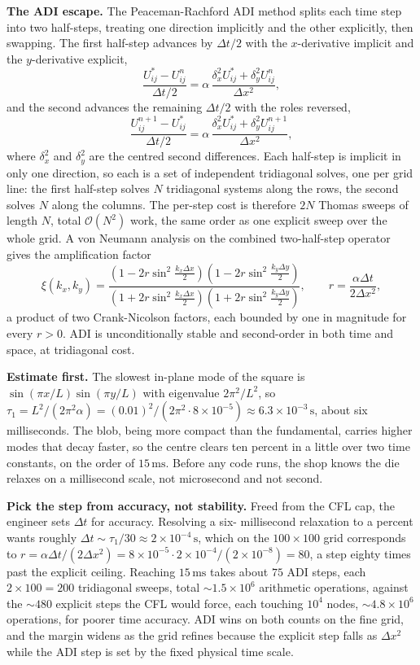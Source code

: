 \textbf{The ADI escape.} The Peaceman-Rachford ADI method splits
each time step into two half-steps, treating one direction
implicitly and the other explicitly, then swapping. The first
half-step advances by $\Delta t/2$ with the $x$-derivative implicit
and the $y$-derivative explicit,
\[
\frac{U^{*}_{ij} - U^{n}_{ij}}{\Delta t/2}
   = \alpha\,\frac{\delta_{x}^{2}U^{*}_{ij} + \delta_{y}^{2}U^{n}_{ij}}{\Delta x^{2}},
\]
and the second advances the remaining $\Delta t/2$ with the roles
reversed,
\[
\frac{U^{n+1}_{ij} - U^{*}_{ij}}{\Delta t/2}
   = \alpha\,\frac{\delta_{x}^{2}U^{*}_{ij} + \delta_{y}^{2}U^{n+1}_{ij}}{\Delta x^{2}},
\]
where $\delta_{x}^{2}$ and $\delta_{y}^{2}$ are the centred second
differences. Each half-step is implicit in only one direction, so
each is a set of independent tridiagonal solves, one per grid line:
the first half-step solves $N$ tridiagonal systems along the rows,
the second solves $N$ along the columns. The per-step cost is
therefore $2N$ Thomas sweeps of length $N$, total $\mathcal{O}(N^{2})$
work, the same order as one explicit sweep over the whole grid. A
von Neumann analysis on the combined two-half-step operator gives
the amplification factor
\[
\xi(k_{x}, k_{y}) =
\frac{(1 - 2r\sin^{2}\tfrac{k_{x}\Delta x}{2})(1 - 2r\sin^{2}\tfrac{k_{y}\Delta y}{2})}
     {(1 + 2r\sin^{2}\tfrac{k_{x}\Delta x}{2})(1 + 2r\sin^{2}\tfrac{k_{y}\Delta y}{2})},
\qquad r = \frac{\alpha\Delta t}{2\Delta x^{2}},
\]
a product of two Crank-Nicolson factors, each bounded by one in
magnitude for every $r > 0$. ADI is unconditionally stable and
second-order in both time and space, at tridiagonal cost.

\textbf{Estimate first.} The slowest in-plane mode of the square is
$\sin(\pi x/L)\sin(\pi y/L)$ with eigenvalue $2\pi^{2}/L^{2}$, so
$\tau_{1} = L^{2}/(2\pi^{2}\alpha) = (0.01)^{2}/(2\pi^{2}\cdot
8\times 10^{-5}) \approx 6.3\times 10^{-3}\,\si{\second}$, about six
milliseconds. The blob, being more compact than the fundamental,
carries higher modes that decay faster, so the centre clears ten
percent in a little over two time constants, on the order of
$15\,\si{\milli\second}$. Before any code runs, the shop knows the
die relaxes on a millisecond scale, not microsecond and not second.

\textbf{Pick the step from accuracy, not stability.} Freed from the
CFL cap, the engineer sets $\Delta t$ for accuracy. Resolving a six-
millisecond relaxation to a percent wants roughly $\Delta t \sim
\tau_{1}/30 \approx 2\times 10^{-4}\,\si{\second}$, which on the
$100\times 100$ grid corresponds to $r = \alpha\Delta t/(2\Delta
x^{2}) = 8\times 10^{-5}\cdot 2\times 10^{-4}/(2\times 10^{-8})
= 80$, a step eighty times past the explicit ceiling. Reaching
$15\,\si{\milli\second}$ takes about $75$ ADI steps, each $2\times
100 = 200$ tridiagonal sweeps, total $\sim 1.5\times 10^{6}$
arithmetic operations, against the $\sim 480$ explicit steps the
CFL would force, each touching $10^{4}$ nodes, $\sim 4.8\times 10^{6}$
operations, for poorer time accuracy. ADI wins on both counts on the
fine grid, and the margin widens as the grid refines because the
explicit step falls as $\Delta x^{2}$ while the ADI step is set by
the fixed physical time scale.

